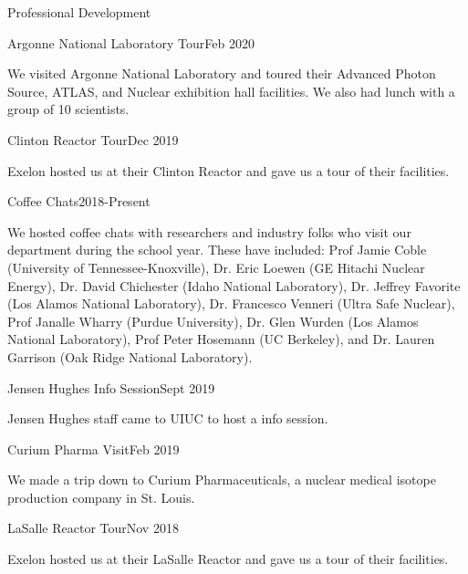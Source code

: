 \documentclass{resume2} %
\begin{document}
\begin{rSection}{Professional Development}
	\begin{rSubsection}{Argonne National Laboratory Tour}{Feb 2020}{}{}
		\item We visited Argonne National Laboratory and toured their Advanced Photon Source, 
		ATLAS, and Nuclear exhibition hall facilities. We also had lunch with a group of 10 scientists. 
	\end{rSubsection}
	\begin{rSubsection}{Clinton Reactor Tour}{Dec 2019}{}{}
		\item Exelon hosted us at their Clinton Reactor and gave us a
		tour of their facilities.
	\end{rSubsection}
	\begin{rSubsection}{Coffee Chats}{2018-Present}{}{}
		\item We hosted coffee chats with researchers and industry folks who
		visit our department during the school year. These have included:
		Prof Jamie Coble (University of Tennessee-Knoxville),
		Dr. Eric Loewen (GE Hitachi Nuclear Energy),
		Dr. David Chichester (Idaho National Laboratory),
		Dr. Jeffrey Favorite (Los Alamos National Laboratory),
		Dr. Francesco Venneri (Ultra Safe Nuclear),
		Prof Janalle Wharry (Purdue University),
		Dr. Glen Wurden (Los Alamos National Laboratory),
		Prof Peter Hosemann (UC Berkeley),
		and Dr. Lauren Garrison (Oak Ridge National Laboratory).
	\end{rSubsection}
	\begin{rSubsection}{Jensen Hughes Info Session}{Sept 2019}{}{}
		\item Jensen Hughes staff came to UIUC to host a info session.
	\end{rSubsection}
	\begin{rSubsection}{Curium Pharma Visit}{Feb 2019}{}{}
		\item We made a trip down to Curium Pharmaceuticals,
		a nuclear medical isotope production company in St. Louis.
	\end{rSubsection}
	\begin{rSubsection}{LaSalle Reactor Tour}{Nov 2018}{}{}
		\item Exelon hosted us at their LaSalle Reactor and gave us a
		tour of their facilities.
	\end{rSubsection}
\end{rSection}


\end{document}
